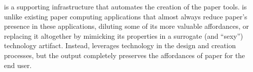 \documentclass{sig-alternate}
\begin{document}
\nifty is a supporting infrastructure that automates the creation of the paper tools. \nifty is unlike existing paper computing applications that almost always reduce paper's presence in these applications, diluting some of its more valuable affordances, or replacing it altogether by mimicking its properties in a surrogate (and ``sexy'') technology artifact. Instead, \nifty leverages technology in the design and creation processes, but the output completely preserves the affordances of paper for the end user.


 



\end{document}
